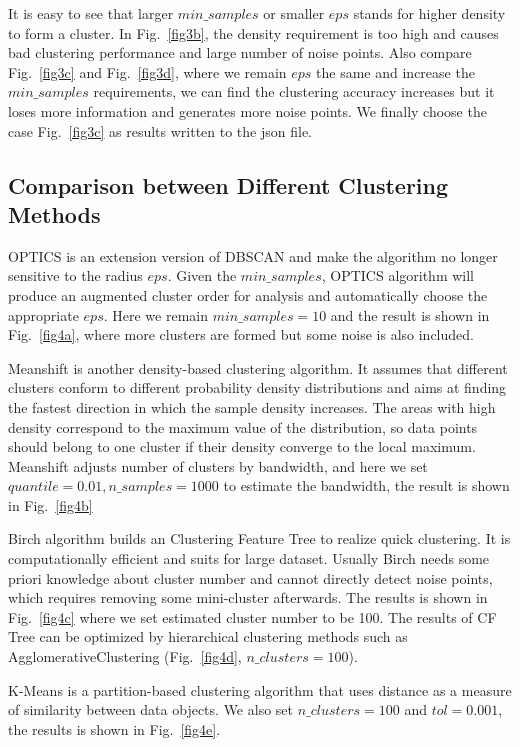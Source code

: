 \documentclass[10pt]{article}
\theoremstyle{nonumberplain}
\begin{document}
It is easy to see that larger $min\_samples$ or smaller $eps$ stands for higher density to form a cluster. In Fig.~\ref{fig3b}, the density requirement is too high and causes bad clustering performance and large number of noise points. Also compare Fig.~\ref{fig3c} and Fig.~\ref{fig3d}, where we remain $eps$ the same and increase the $min\_samples$ requirements, we can find the clustering accuracy increases but it loses more information and generates more noise points. We finally choose the case Fig.~\ref{fig3c} as results written to the json file.

\subsection{Comparison between Different Clustering Methods}

\hspace{1.0em}
OPTICS is an extension version of DBSCAN and make the algorithm no longer sensitive to the radius $eps$. Given the $min\_samples$, OPTICS algorithm will produce an augmented cluster order for analysis and automatically choose the appropriate $eps$. Here we remain $min\_samples=10$ and the result is shown in Fig.~\ref{fig4a}, where more clusters are formed but some noise is also included.

Meanshift is another density-based clustering algorithm. It assumes that different clusters conform to different probability density distributions and aims at finding the fastest direction in which the sample density increases. The areas with high density correspond to the maximum value of the distribution, so data points should belong to one cluster if their density converge to the local maximum. Meanshift adjusts number of clusters by bandwidth, and here we set $quantile=0.01, n\_samples=1000$ to estimate the bandwidth, the result is shown in Fig.~\ref{fig4b} 

Birch algorithm builds an Clustering Feature Tree to realize quick clustering. It is computationally efficient and suits for large dataset. Usually Birch needs some priori knowledge about cluster number and cannot directly detect noise points, which requires removing some mini-cluster afterwards. The results is shown in Fig.~\ref{fig4c} where we set estimated cluster number to be 100. The results of CF Tree can be optimized by hierarchical clustering methods such as AgglomerativeClustering (Fig.~\ref{fig4d}, $n\_clusters=100$). 

K-Means is a partition-based clustering algorithm that uses distance as a measure of similarity between data objects. We also set $n\_clusters=100$ and $tol=0.001$, the results is shown in Fig.~\ref{fig4e}.
\end{document}

